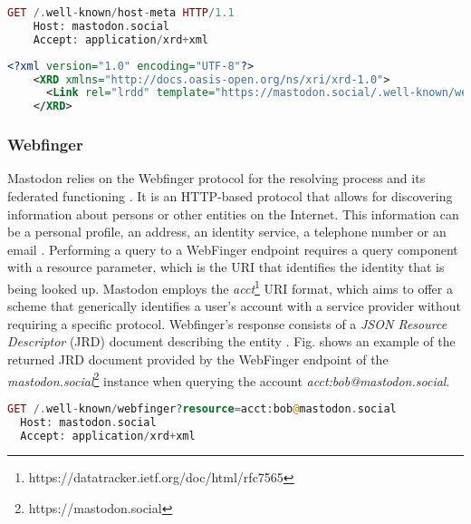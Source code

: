 \lstset{style=JSONStyle}
\begin{lstlisting}[language=PHP, caption=Web Host Metadata request to mastodon.social, label=fig:host_metadata_request, float=ht]
    GET /.well-known/host-meta HTTP/1.1
    Host: mastodon.social
    Accept: application/xrd+xml
\end{lstlisting}

\lstset{style=JSONStyle}
\begin{lstlisting}[language=XML, caption=Web Host metadata response from mastodon.social, label=fig:host_metadata_response, float=h!]
    <?xml version="1.0" encoding="UTF-8"?>
    <XRD xmlns="http://docs.oasis-open.org/ns/xri/xrd-1.0">
      <Link rel="lrdd" template="https://mastodon.social/.well-known/webfinger?resource={uri}"/>
    </XRD>
\end{lstlisting}

\subsubsection*{\textbf{Webfinger}}
Mastodon relies on the Webfinger protocol for the resolving process and its federated functioning \cite{rochko_2020}. It is an HTTP-based protocol that allows for discovering information about persons or other entities on the Internet. This information can be a personal profile, an address, an identity service, a telephone number or an email \cite{jones_salgueiro_jones_smarr_2013}. Performing a query to a WebFinger endpoint requires a query component with a resource parameter, which is the URI that identifies the identity that is being looked up. Mastodon employs the \emph{acct}\footnote{https://datatracker.ietf.org/doc/html/rfc7565} URI format, which aims to offer a scheme that generically identifies a user's account with a service provider without requiring a specific protocol. Webfinger's response consists of a \emph{JSON Resource Descriptor} (JRD) document describing the entity \cite{jones_salgueiro_jones_smarr_2013}. Fig. \label{Webfinger response from mastodon.social} shows an example of the returned JRD document provided by the WebFinger endpoint of the \emph{mastodon.social}\footnote{https://mastodon.social} instance when querying the account \emph{acct:bob@mastodon.social}.

\lstset{style=JSONStyle}
\begin{lstlisting}[language=PHP, caption=HTTP request to Webfinger endpoint, label=Webfinger request, float=h]
  GET /.well-known/webfinger?resource=acct:bob@mastodon.social
  Host: mastodon.social
  Accept: application/xrd+xml
\end{lstlisting}

